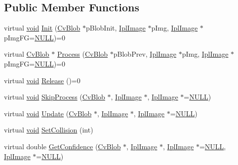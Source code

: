 \subsection*{Public Member Functions}
\begin{DoxyCompactItemize}
\item 
virtual \hyperlink{legacy_8hpp_a8bb47f092d473522721002c86c13b94e}{void} \hyperlink{classCvBlobTrackerOne_a33866b86d45431e18ab536b2208a78ad}{Init} (\hyperlink{structCvBlob}{Cv\-Blob} $\ast$p\-Blob\-Init, \hyperlink{core_2types__c_8h_a249298f383f3b430b476542076320c57}{Ipl\-Image} $\ast$p\-Img, \hyperlink{core_2types__c_8h_a249298f383f3b430b476542076320c57}{Ipl\-Image} $\ast$p\-Img\-F\-G=\hyperlink{Config_8cpp_a070d2ce7b6bb7e5c05602aa8c308d0c4}{N\-U\-L\-L})=0
\item 
virtual \hyperlink{structCvBlob}{Cv\-Blob} $\ast$ \hyperlink{classCvBlobTrackerOne_af970d2147390e589591a685e53969ff2}{Process} (\hyperlink{structCvBlob}{Cv\-Blob} $\ast$p\-Blob\-Prev, \hyperlink{core_2types__c_8h_a249298f383f3b430b476542076320c57}{Ipl\-Image} $\ast$p\-Img, \hyperlink{core_2types__c_8h_a249298f383f3b430b476542076320c57}{Ipl\-Image} $\ast$p\-Img\-F\-G=\hyperlink{Config_8cpp_a070d2ce7b6bb7e5c05602aa8c308d0c4}{N\-U\-L\-L})=0
\item 
virtual \hyperlink{legacy_8hpp_a8bb47f092d473522721002c86c13b94e}{void} \hyperlink{classCvBlobTrackerOne_a69c53482de6e9f24e755be90dda027cb}{Release} ()=0
\item 
virtual \hyperlink{legacy_8hpp_a8bb47f092d473522721002c86c13b94e}{void} \hyperlink{classCvBlobTrackerOne_af8262f159f1ff5e1fde50588dd7a6506}{Skip\-Process} (\hyperlink{structCvBlob}{Cv\-Blob} $\ast$, \hyperlink{core_2types__c_8h_a249298f383f3b430b476542076320c57}{Ipl\-Image} $\ast$, \hyperlink{core_2types__c_8h_a249298f383f3b430b476542076320c57}{Ipl\-Image} $\ast$=\hyperlink{Config_8cpp_a070d2ce7b6bb7e5c05602aa8c308d0c4}{N\-U\-L\-L})
\item 
virtual \hyperlink{legacy_8hpp_a8bb47f092d473522721002c86c13b94e}{void} \hyperlink{classCvBlobTrackerOne_a92f0b8aec4e6d5bb6af75bcc60a87b67}{Update} (\hyperlink{structCvBlob}{Cv\-Blob} $\ast$, \hyperlink{core_2types__c_8h_a249298f383f3b430b476542076320c57}{Ipl\-Image} $\ast$, \hyperlink{core_2types__c_8h_a249298f383f3b430b476542076320c57}{Ipl\-Image} $\ast$=\hyperlink{Config_8cpp_a070d2ce7b6bb7e5c05602aa8c308d0c4}{N\-U\-L\-L})
\item 
virtual \hyperlink{legacy_8hpp_a8bb47f092d473522721002c86c13b94e}{void} \hyperlink{classCvBlobTrackerOne_a6a1dabb28778f9a2b2e6c0cb4fcf6382}{Set\-Collision} (int)
\item 
virtual double \hyperlink{classCvBlobTrackerOne_a572fe03dc2f9b7462f529e55ebadaa07}{Get\-Confidence} (\hyperlink{structCvBlob}{Cv\-Blob} $\ast$, \hyperlink{core_2types__c_8h_a249298f383f3b430b476542076320c57}{Ipl\-Image} $\ast$, \hyperlink{core_2types__c_8h_a249298f383f3b430b476542076320c57}{Ipl\-Image} $\ast$=\hyperlink{Config_8cpp_a070d2ce7b6bb7e5c05602aa8c308d0c4}{N\-U\-L\-L}, \hyperlink{core_2types__c_8h_a249298f383f3b430b476542076320c57}{Ipl\-Image} $\ast$=\hyperlink{Config_8cpp_a070d2ce7b6bb7e5c05602aa8c308d0c4}{N\-U\-L\-L})
\end{DoxyCompactItemize}
